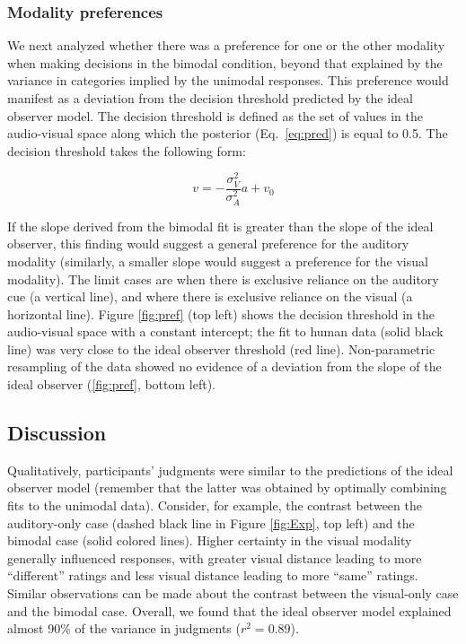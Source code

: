 \documentclass[10pt,letterpaper]{article}
\begin{document}
\subsubsection{Modality preferences}

We next analyzed whether there was a preference for one or the other modality when making decisions in the bimodal condition, beyond that explained by the variance in categories implied by the unimodal responses. This preference would manifest as a deviation from the decision threshold predicted by the ideal observer model. The decision threshold is defined as the set of values in the audio-visual space along which the posterior (Eq.~\ref{eq:pred}) is equal to 0.5. The decision threshold takes the following form:

\begin{equation}
v=-\frac{\sigma^2_V}{\sigma^2_A}a+v_0
\label{eq:threshold}
\end{equation}

If the slope derived from the bimodal fit is greater than the slope of the ideal observer, this finding would suggest a general preference for the auditory modality (similarly, a smaller slope would suggest a preference for the visual modality). The limit cases are when there is exclusive reliance on the auditory cue (a vertical line), and where there is exclusive reliance on the visual (a horizontal line). Figure \ref{fig:pref} (top left) shows the decision threshold in the audio-visual space with a constant intercept; the fit to human data  (solid black line) was very close to the ideal observer threshold (red line). Non-parametric resampling of the data showed no evidence of a deviation from the slope of the ideal observer (\ref{fig:pref}, bottom left).

\subsection{Discussion}

Qualitatively, participants' judgments were similar to the predictions of the ideal observer model (remember that the latter was obtained by optimally combining fits to the unimodal data). Consider, for example, the contrast between the auditory-only case (dashed black line in Figure \ref{fig:Exp}, top left) and the bimodal case (solid colored lines).  Higher certainty in the visual modality generally influenced responses, with greater visual distance leading to more ``different'' ratings and less visual distance leading to more ``same'' ratings. Similar observations can be made about the contrast between the visual-only case and the bimodal case.  Overall, we found that the ideal observer model explained almost 90\% of the variance in judgments ($r^2=0.89$). 
\end{document}
